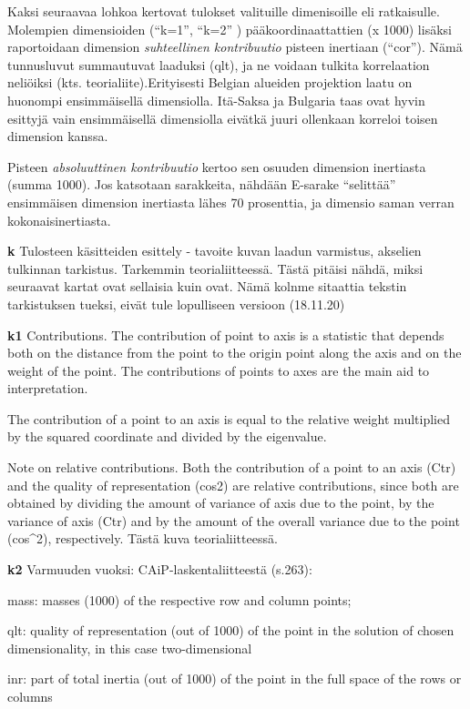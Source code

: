 \documentclass[
  finnish,
]{book}
\begin{document}
Kaksi seuraavaa lohkoa kertovat tulokset valituille dimenisoille eli ratkaisulle.
Molempien dimensioiden (``k=1'', ``k=2'' ) pääkoordinaattattien (x 1000) lisäksi
raportoidaan dimension \emph{suhteellinen kontribuutio} pisteen inertiaan (``cor'').
Nämä tunnusluvut summautuvat laaduksi (qlt), ja ne voidaan tulkita korrelaation
neliöiksi (kts. teorialiite).Erityisesti Belgian alueiden projektion laatu on
huonompi ensimmäisellä dimensiolla. Itä-Saksa ja Bulgaria taas ovat hyvin esittyjä
vain ensimmäisellä dimensiolla eivätkä juuri ollenkaan korreloi toisen dimension
kanssa.

Pisteen \emph{absoluuttinen kontribuutio} kertoo sen osuuden dimension inertiasta
(summa 1000). Jos katsotaan sarakkeita, nähdään E-sarake ``selittää'' ensimmäisen
dimension inertiasta lähes 70 prosenttia, ja dimensio saman verran
kokonaisinertiasta.

\textbf{k} Tulosteen käsitteiden esittely - tavoite kuvan laadun varmistus, akselien
tulkinnan tarkistus. Tarkemmin teorialiitteessä. Tästä pitäisi nähdä, miksi seuraavat
kartat ovat sellaisia kuin ovat. Nämä kolnme sitaattia tekstin tarkistuksen tueksi,
eivät tule lopulliseen versioon (18.11.20)

\textbf{k1} Contributions. The contribution of point to axis is a statistic that depends
both on the distance from the point to the origin point along the axis and on
the weight of the point. The contributions of points to axes are the main aid to
interpretation.

The contribution of a point to an axis is equal to the relative weight
multiplied by the squared coordinate and divided by the eigenvalue.

Note on relative contributions.
Both the contribution of a point to an axis (Ctr) and the quality of
representation (cos2) are relative contributions, since both are obtained by
dividing the amount of variance of axis due to the point, by the variance of
axis (Ctr) and by the amount of the overall variance due to the point (cos\^{}2),
respectively. Tästä kuva teorialiitteessä.

\textbf{k2} Varmuuden vuoksi: CAiP-laskentaliitteestä (s.263):

mass: masses (1000) of the respective row and column points;

qlt: quality of representation (out of 1000) of the point in the solution of
chosen dimensionality, in this case two-dimensional

inr: part of total inertia (out of 1000) of the point in the full space of the
rows or columns
\end{document}
